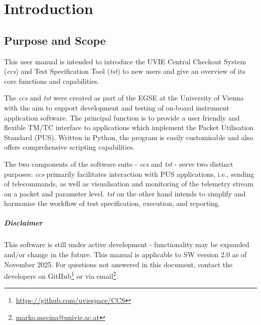 \approvalpage

\tableofcontents
\newpage

\begin{versionhistory}


\end{versionhistory}


\chapter{Introduction}
\section{Purpose and Scope} 
This user manual is intended to introduce the UVIE Central Checkout System (\textit{ccs}) and Test Specification Tool (\textit{tst}) to new users and give an overview of its core functions and capabilities.

The \textit{ccs} and \textit{tst} were created as part of the EGSE at the University of Vienna with the aim to support development and testing of on-board instrument application software.
The principal function is to provide a user friendly and flexible TM/TC interface to applications which implement the Packet Utilisation Standard (PUS).
Written in Python, the program is easily customisable and also offers comprehensive scripting capabilities.

The two components of the software suite - \textit{ccs} and \textit{tst} - serve two distinct purposes: \textit{ccs} primarily facilitates interaction with PUS applications,
i.e., sending of telecommands, as well as visualisation and monitoring of the telemetry stream on a packet and parameter level. \textit{tst} on the other hand intends to
simplify and harmonise the workflow of test specification, execution, and reporting.

\paragraph{Disclaimer}
This software is still under active development - functionality may be expanded and/or change in the future. This manual is applicable to SW version 2.0 as of November 2025.
For questions not answered in this document, contact the developers on GitHub\footnote{\href{https://github.com/uviespace/CCS}{\url{https://github.com/uviespace/CCS}}}
or via email\footnote{\href{mailto:marko.mecina@univie.ac.at}{\url{marko.mecina@univie.ac.at}}}.



